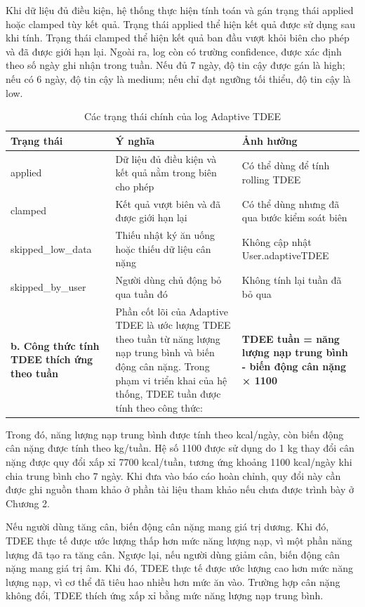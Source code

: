 Khi dữ liệu đủ điều kiện, hệ thống thực hiện tính toán và gán trạng thái applied hoặc clamped tùy kết quả. Trạng thái applied thể hiện kết quả được sử dụng sau khi tính. Trạng thái clamped thể hiện kết quả ban đầu vượt khỏi biên cho phép và đã được giới hạn lại. Ngoài ra, log còn có trường confidence, được xác định theo số ngày ghi nhận trong tuần. Nếu đủ 7 ngày, độ tin cậy được gán là high; nếu có 6 ngày, độ tin cậy là medium; nếu chỉ đạt ngưỡng tối thiểu, độ tin cậy là low.

\begin{table}[H]
\centering
\caption{Các trạng thái chính của log Adaptive TDEE}
\begin{tabular}{|p{4cm}|p{5.5cm}|p{5.5cm}|}
\hline
\textbf{Trạng thái} & \textbf{Ý nghĩa} & \textbf{Ảnh hưởng} \\ \hline
applied & Dữ liệu đủ điều kiện và kết quả nằm trong biên cho phép & Có thể dùng để tính rolling TDEE \\ \hline
clamped & Kết quả vượt biên và đã được giới hạn lại & Có thể dùng nhưng đã qua bước kiểm soát biên \\ \hline
skipped\_low\_data & Thiếu nhật ký ăn uống hoặc thiếu dữ liệu cân nặng & Không cập nhật User.adaptiveTDEE \\ \hline
skipped\_by\_user & Người dùng chủ động bỏ qua tuần đó & Không tính lại tuần đã bỏ qua \\ \hline
\textbf{b. Công thức tính TDEE thích ứng theo tuần} & Phần cốt lõi của Adaptive TDEE là ước lượng TDEE theo tuần từ năng lượng nạp trung bình và biến động cân nặng. Trong phạm vi triển khai của hệ thống, TDEE tuần được tính theo công thức: & \textbf{TDEE tuần = năng lượng nạp trung bình - biến động cân nặng × 1100} \\ \hline
\end{tabular}
\end{table}

Trong đó, năng lượng nạp trung bình được tính theo kcal/ngày, còn biến động cân nặng được tính theo kg/tuần. Hệ số 1100 được sử dụng do 1 kg thay đổi cân nặng được quy đổi xấp xỉ 7700 kcal/tuần, tương ứng khoảng 1100 kcal/ngày khi chia trung bình cho 7 ngày. Khi đưa vào báo cáo hoàn chỉnh, quy đổi này cần được ghi nguồn tham khảo ở phần tài liệu tham khảo nếu chưa được trình bày ở Chương 2.

Nếu người dùng tăng cân, biến động cân nặng mang giá trị dương. Khi đó, TDEE thực tế được ước lượng thấp hơn mức năng lượng nạp, vì một phần năng lượng đã tạo ra tăng cân. Ngược lại, nếu người dùng giảm cân, biến động cân nặng mang giá trị âm. Khi đó, TDEE thực tế được ước lượng cao hơn mức năng lượng nạp, vì cơ thể đã tiêu hao nhiều hơn mức ăn vào. Trường hợp cân nặng không đổi, TDEE thích ứng xấp xỉ bằng mức năng lượng nạp trung bình.

